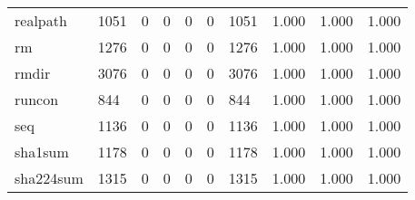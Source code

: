 \begin{longtable}{lp{2.0cm}p{2.0cm}p{2.0cm}p{2.0cm}p{2.0cm}p{2.0cm}p{2.0cm}p{2.0cm}p{2.0cm}}
realpath  &                   1051 &                                  0 &                                 0 &                                0 &                                 0 &                            1051 &                                   1.000 &                                  1.000 &                                1.000 \\
rm        &                   1276 &                                  0 &                                 0 &                                0 &                                 0 &                            1276 &                                   1.000 &                                  1.000 &                                1.000 \\
rmdir     &                   3076 &                                  0 &                                 0 &                                0 &                                 0 &                            3076 &                                   1.000 &                                  1.000 &                                1.000 \\
runcon    &                    844 &                                  0 &                                 0 &                                0 &                                 0 &                             844 &                                   1.000 &                                  1.000 &                                1.000 \\
seq       &                   1136 &                                  0 &                                 0 &                                0 &                                 0 &                            1136 &                                   1.000 &                                  1.000 &                                1.000 \\
sha1sum   &                   1178 &                                  0 &                                 0 &                                0 &                                 0 &                            1178 &                                   1.000 &                                  1.000 &                                1.000 \\
sha224sum &                   1315 &                                  0 &                                 0 &                                0 &                                 0 &                            1315 &                                   1.000 &                                  1.000 &                                1.000 \\

\end{longtable}
